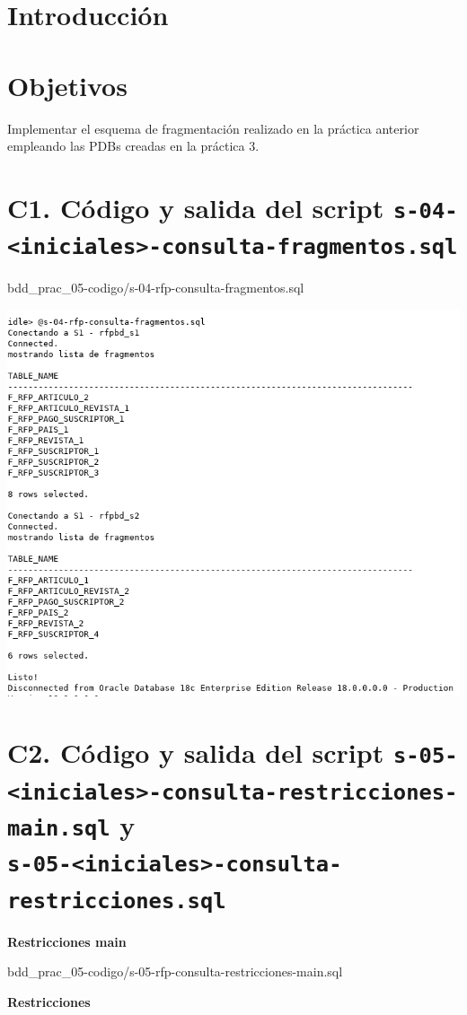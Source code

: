 \documentclass{article}
\begin{document}
\section*{Introducción}

\section*{Objetivos}
Implementar el esquema de fragmentación realizado en la práctica anterior 
empleando las PDBs creadas en la práctica 3.

\section*{C1. Código y salida del script 
    \texttt{s-04-<iniciales>-consulta-fragmentos.sql}}


{bdd_prac_05-codigo/s-04-rfp-consulta-fragmentos.sql}

\includegraphics[width=0.8\linewidth]{bdd_prac05-c1-fragmentos}

\section*{C2. Código y salida del script 
\texttt{s-05-<iniciales>-consulta-restricciones-main.sql} y\\
\texttt{s-05-<iniciales>-consulta-restricciones.sql}}

\textbf{Restricciones main}

{bdd_prac_05-codigo/s-05-rfp-consulta-restricciones-main.sql}

\textbf{Restricciones}
\end{document}

